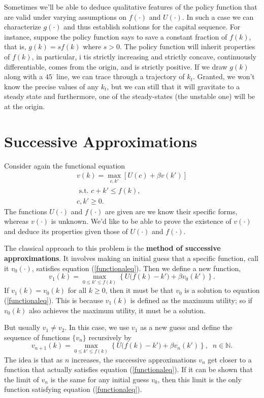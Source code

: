 \documentclass[12pt]{article}
\newcommand{\N}{\mathbb{N}}
\theoremstyle{definition}
\begin{document}
Sometimes we'll be able to deduce qualitative features of the policy function that are valid under varying assumptions on $f(\cdot)$ and $U(\cdot)$. In such a case we can characterize $g(\cdot)$ and thus establish solutions for the capital sequence. For instance, suppose the policy function says to save a constant fraction of $f(k)$, that is, $g(k)=sf(k)$ where $s>0$. The policy function will inherit properties of $f(k)$, in particular, i tis strictly increasing and strictly concave, continuously differentiable, comes from the origin, and is strictly positive. If we draw $g(k)$ along with a $45^{\cdot}$ line, we can trace through a trajectory of $k_t$. Granted, we won't know the precise values of any $k_t$, but we can still that it will gravitate to a steady state and furthermore, one of the steady-states (the unstable one) will be at the origin.



\section{Successive Approximations}

Consider again the functional equation
\begin{align}
	v(k) = \max_{c,k'} [U(c) + \beta v(k')] \label{functionaleq}\\
	\text{ s.t. } c + k' \leq f(k), \nonumber \\
	c,k' \geq 0. \nonumber
\end{align}
The functions $U(\cdot)$ and $f(\cdot)$ are given are we know their specific forms, whereas $v(\cdot)$ is unknown. We'd like to be able to prove the existence of $v(\cdot)$ and deduce its properties given those of $U(\cdot)$ and $f(\cdot)$. 

The classical approach to this problem is the \textbf{method of successive approximations}. It involves making an initial guess that a specific function, call it $v_0(\cdot)$, satisfies equation (\ref{functionaleq}). Then we define a new function,
	\[v_1(k) = \max_{0 \leq k' \leq f(k)} \left\{U\big( f(k) - k' \big) + \beta v_0(k') \right\}.	\]
If $v_1(k)=v_0(k)$ for all $k \geq 0$, then it must be that $v_0$ is a solution to equation (\ref{functionaleq}). This is because $v_1(k)$ is defined as the maximum utility; so if $v_0(k)$ also achieves the maximum utility, it must be a solution.

But usually $v_1 \neq v_2$. In this case, we use $v_1$ as a new guess and define the sequence of functions $\{v_n\}$ recursively by
	\[v_{n+1}(k) = \max_{0 \leq k' \leq f(k)} \left\{U\big( f(k) - k' \big) + \beta v_n(k') \right\}, \;\; n \in \N.	\]
The idea is that as $n$ increases, the successive approximations $v_n$ get closer to a function that actually satisfies 	equation (\ref{functionaleq}). If it can be shown that the limit of $v_n$ is the same for any initial guess $v_0$, then this limit is the only function satisfying equation (\ref{functionaleq}). 
\end{document}

